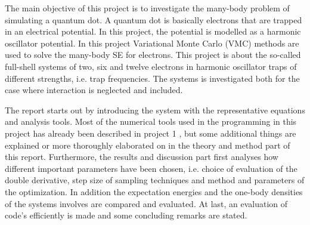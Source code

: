 The main objective of this project is to investigate the many-body problem of simulating a quantum dot. A quantum dot is basically electrons that are trapped in an electrical potential. In this project, the potential is modelled as a harmonic oscillator potential. In this project Variational Monte Carlo (VMC) methods are used to solve the many-body SE for electrons. This project is about the so-called full-shell systems of two, six and twelve electrons in harmonic oscillator traps of different strengths, i.e. trap frequencies. The systems is investigated both for the case where interaction is neglected and included.

The report starts out by introducing the system with the representative equations and analysis tools. Most of the numerical tools used in the programming in this project has already been described in project 1 \cite{project1}, but some additional things are explained or more thoroughly elaborated on in the theory and method part of this report. Furthermore, the results and discussion part first analyses how different important parameters have been chosen, i.e. choice of evaluation of the double derivative, step size of sampling techniques and method and parameters of the optimization. In addition the expectation energies and the one-body densities of the systems involves are compared and evaluated. At last, an evaluation of code's efficiently is made and some concluding remarks are stated.